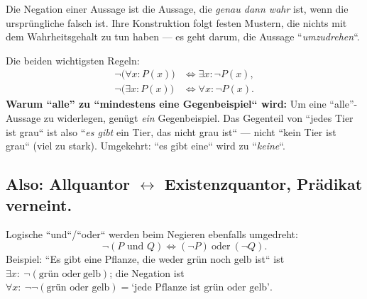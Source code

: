 


Die Negation einer Aussage ist die Aussage, die \emph{genau dann wahr}
ist, wenn die ursprüngliche falsch ist. Ihre Konstruktion folgt festen
Mustern, die nichts mit dem Wahrheitsgehalt zu tun haben --- es geht
darum, die Aussage ``\emph{umzudrehen}``.

\begin{werkzeugkasten}
Die beiden wichtigsten Regeln:
\begin{align}
  \neg\bigl(\forall x: P(x)\bigr) &\Longleftrightarrow \exists x:
  \neg P(x),\\
  \neg\bigl(\exists x:P(x)\bigr) &\Longleftrightarrow \forall x:\neg P(x).
\end{align}
\textbf{Warum ``alle'' zu ``mindestens eine Gegenbeispiel`` wird:} Um eine
``alle''-Aussage zu widerlegen, genügt \emph{ein} Gegenbeispiel. Das
Gegenteil von ``jedes Tier ist grau`` ist also ``\emph{es gibt} ein Tier,
das nicht grau ist`` --- nicht ``kein Tier ist grau`` (viel zu stark).
Umgekehrt: ``es gibt eine`` wird zu ``\emph{keine}``.

\subsection*{Also: Allquantor $\leftrightarrow$ Existenzquantor, Prädikat
verneint.}
\end{werkzeugkasten}

\begin{werkzeugkasten}
Logische ``und``/``oder`` werden beim Negieren ebenfalls umgedreht:
\begin{equation}
  \neg(P \text{ und } Q) \Longleftrightarrow (\neg P)\ \text{oder}\ (\neg Q).
\end{equation}
Beispiel: ``Es gibt eine Pflanze, die weder grün noch gelb ist`` ist
$\exists x:\ \neg(\text{grün }\text{oder}\ \text{gelb})$; die Negation
ist $\forall x:\ \neg\neg(\text{grün oder gelb}) =
\text{`jede Pflanze ist grün oder gelb'}$.
\end{werkzeugkasten}

